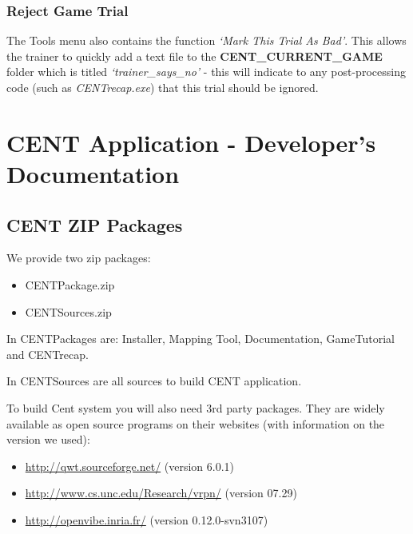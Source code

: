 \documentclass[letterpaper,10pt,english]{sphinxmanual}
\begin{document}
\subsection{\textbf{Reject Game Trial}}
\label{index:reject-game-trial}
The Tools menu also contains the function \emph{`Mark This Trial As Bad'}. This allows the trainer to quickly add a text file to the \textbf{CENT\_CURRENT\_GAME} folder which is titled \emph{`trainer\_says\_no'} - this will indicate to any post-processing code (such as \emph{CENTrecap.exe}) that this trial should be ignored.


\chapter{CENT Application - Developer's Documentation}
\label{index:cent-application-developer-s-documentation}

\section{\textbf{CENT ZIP Packages}}
\label{index:cent-package}\label{index:cent-zip-packages}
We provide two zip packages:
\begin{itemize}
\item {} 
CENTPackage.zip

\item {} 
CENTSources.zip

\end{itemize}

In CENTPackages are: Installer, Mapping Tool, Documentation, GameTutorial and CENTrecap.

In CENTSources are all sources to build CENT application.

To build Cent system you will also need 3rd party packages. They are widely available as open source programs on their websites (with information on the version we used):
\begin{itemize}
\item {} 
\href{http://qwt.sourceforge.net/}{http://qwt.sourceforge.net/} (version 6.0.1)

\item {} 
\href{http://www.cs.unc.edu/Research/vrpn/}{http://www.cs.unc.edu/Research/vrpn/} (version 07.29)

\item {} 
\href{http://openvibe.inria.fr/}{http://openvibe.inria.fr/} (version 0.12.0-svn3107)

\end{itemize}
\end{document}
